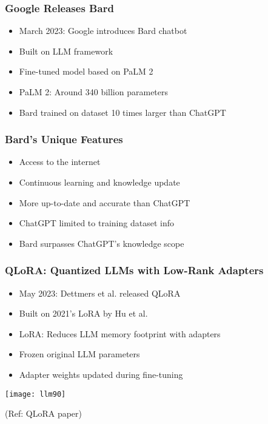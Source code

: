 \begin{frame}[fragile]\frametitle{Google Releases Bard}
    \begin{itemize}
        \item March 2023: Google introduces Bard chatbot
        \item Built on LLM framework
        \item Fine-tuned model based on PaLM 2
        \item PaLM 2: Around 340 billion parameters
        \item Bard trained on dataset 10 times larger than ChatGPT
    \end{itemize}
\end{frame}

\begin{frame}[fragile]\frametitle{Bard's Unique Features}
    \begin{itemize}
        \item Access to the internet
        \item Continuous learning and knowledge update
        \item More up-to-date and accurate than ChatGPT
        \item ChatGPT limited to training dataset info
        \item Bard surpasses ChatGPT's knowledge scope
    \end{itemize}
\end{frame}

\begin{frame}[fragile]\frametitle{QLoRA: Quantized LLMs with Low-Rank Adapters}
    \begin{itemize}
        \item May 2023: Dettmers et al. released QLoRA
        \item Built on 2021's LoRA by Hu et al.
        \item LoRA: Reduces LLM memory footprint with adapters
        \item Frozen original LLM parameters
        \item Adapter weights updated during fine-tuning
    \end{itemize}
	
\begin{center}
\texttt{[image: llm90]}
\end{center}		

{\tiny (Ref: QLoRA paper)}
			
\end{frame}

